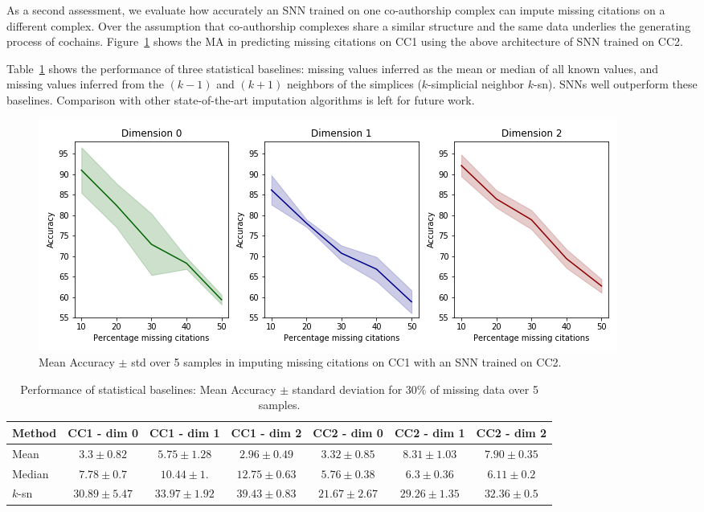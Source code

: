 As a second assessment, we evaluate how accurately an SNN trained on one co-authorship complex can impute missing citations on a different complex. Over the assumption that co-authorship complexes share a similar structure and the same data underlies the generating process of cochains.
Figure~\ref{fig:transfer-learning} shows the MA in predicting missing citations on CC1 using the above architecture of SNN trained on CC2.

Table~\ref{table:comparison-SNN} shows the performance of three statistical baselines: missing values inferred as the mean or median of all known values, and missing values inferred from the $(k-1)$ and $(k+1)$ neighbors of the simplices ($k$-simplicial neighbor $k$-sn).
SNNs well outperform these baselines.
Comparison with other state-of-the-art imputation algorithms is left for future work.

\begin{figure}[htbp]
  \centering
\includegraphics[scale=0.35]{./figures/accuracy_network1_pretrained.png}
  \caption{Mean Accuracy $\pm$ std over 5 samples in imputing missing citations on CC1 with an SNN trained on CC2.} \label{fig:transfer-learning}
\end{figure}

\begin{table}[htbp]
  \centering
  \scriptsize{
  \begin{tabular}{lcccccc}
    \toprule
    Method   & CC1 - dim 0   & CC1 - dim 1   & CC1 - dim 2   & CC2 - dim 0  & CC2 - dim 1  & CC2 - dim 2 \\
    \midrule
    Mean & $3.3 \pm 0.82$ & $5.75\pm 1.28$  &$ 2.96\pm 0.49$  & $3.32 \pm 0.85$ & $8.31 \pm 1.03$  & $7.90\pm 0.35$\\
    Median & $7.78 \pm 0.7$   & $10.44 \pm 1.$ &$ 12.75 \pm 0.63 $ & $5.76 \pm 0.38 $&$ 6.3\pm 0.36  $&$ 6.11\pm 0.2$\\
    $k$-sn & $30.89\pm 5.47 $& $33.97 \pm 1.92$ & $39.43 \pm 0.83  $& $21.67 \pm 2.67 $&$ 29.26\pm 1.35$   &$ 32.36 \pm 0.5 $\\
    \bottomrule
  \end{tabular}}
   \vspace{2pt}
  \caption{%
      Performance of statistical baselines: Mean Accuracy $\pm$ standard deviation for $30\%$ of missing data over 5 samples. 
  }\label{table:comparison-SNN}
\end{table}%
